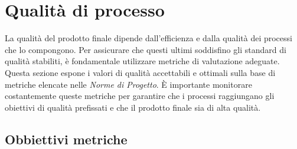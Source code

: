 \section{Qualità di processo}
La qualità del prodotto finale dipende dall'efficienza e dalla qualità dei
processi che lo compongono. Per assicurare che questi ultimi soddisfino gli
standard di qualità stabiliti, è fondamentale utilizzare metriche di valutazione
adeguate. Questa sezione espone i valori di qualità accettabili e ottimali
sulla base di metriche elencate nelle \textit{Norme di Progetto}. È importante monitorare costantemente queste
metriche per garantire che i processi raggiungano gli obiettivi di qualità
prefissati e che il prodotto finale sia di alta qualità.

\subsection{Obbiettivi metriche}
